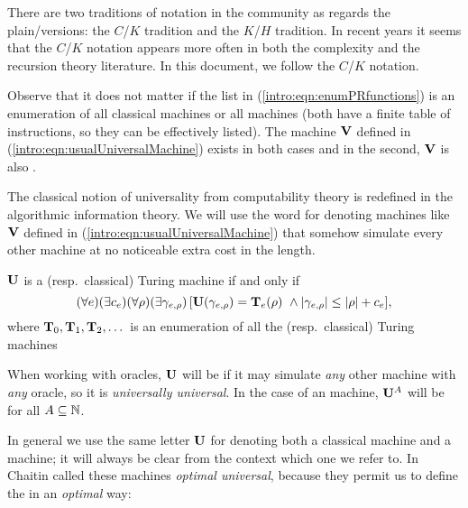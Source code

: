 There are two traditions of notation in the \kolcomp community as
regards the plain/\pfree versions: the $C$/$K$ tradition and the
$K$/$H$ tradition. In recent years it seems that the $C$/$K$
notation appears more often in both the complexity and the
recursion theory literature. In this document, we follow the
$C$/$K$ notation.

\bigskip

Observe that it does not matter if the list in
(\ref{intro:eqn:enumPRfunctions}) is an enumeration of all
classical machines or all \pfree machines (both have a finite
table of instructions, so they can be effectively listed). The
machine ${\bf V}$ defined in (\ref{intro:eqn:usualUniversalMachine})
exists in both cases and in the second, ${\bf V}$ is also \pfree.


The classical notion of universality from computability theory is
redefined in the algorithmic information theory. We will use the
word {\em \opt} for denoting machines like ${\bf V}$ defined in
(\ref{intro:eqn:usualUniversalMachine}) that somehow simulate
every other machine at no noticeable extra cost in the length.

\begin{definicion}[\Optity]\label{intro:def:optimal}
 ${\bf U}$ is a {\em \opt} \pfree
(resp.\ classical) Turing machine if and only if
$$
(\forall e)(\exists c_e)(\forall \rho)(\exists \gamma_{e,\rho})\,
[{\bf U}(\gamma_{e,\rho})={\bf T}_e(\rho) \ \wedge | \gamma_{e,\rho} |\leq
| \rho |+c_e],
$$
where ${\bf T}_0,{\bf T}_1,{\bf T}_2,\dots$ is an enumeration of all the \pfree
(resp.\ classical) Turing machines
\end{definicion}

When working with oracles, ${\bf U}$ will be \opt if it may simulate
{\em any} other machine with {\em any} oracle, so it is {\em
universally universal}. In the case of an \pfree \opt machine,
${\bf U}^A$ will be \pfree for all $A\subseteq\mathbb{N}$.

In general we use the same letter ${\bf U}$ for denoting both a
classical \opt machine and a \pfree \opt machine; it will always
be clear from the context which one we refer to. In~\cite{chaitin1975theory}
Chaitin called these machines {\em optimal universal}, because
they permit us to define the \kolcomp in an {\em optimal} way:


